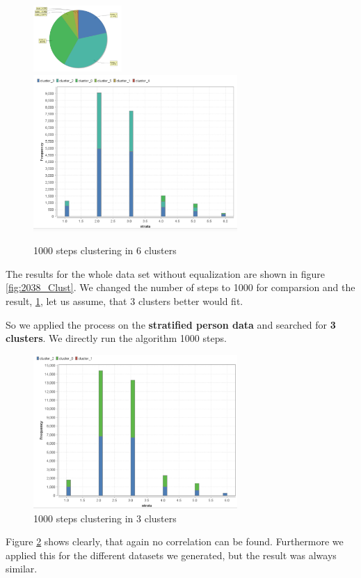 \begin{figure}[!htbp]
\centering
\includegraphics[width=0.3\textwidth]{vectorclusteringcluster1000.PNG}
\includegraphics[width=0.69\textwidth]{vectorClustering1000.PNG}
\caption{1000 steps clustering in 6 clusters}
\label{fig:1000vect}
\end{figure}

The results for the whole data set without equalization are shown in figure \ref{fig:2038_Clust}. We changed the number of steps to 1000 for comparsion and the result, \ref{fig:1000vect}, let us assume, that 3 clusters better would fit. 


So we applied the process on the \textbf{stratified person data} and searched for \textbf{3 clusters}. We directly run the algorithm 1000 steps.

\begin{figure}[!htbp]
\centering
\includegraphics[width=0.69\textwidth]{vectorClustering31000.PNG}
\caption{1000 steps clustering in 3 clusters}
\label{fig:1000vect3}
\end{figure}

Figure \ref{fig:1000vect3} shows clearly, that again no correlation can be found. Furthermore we applied this for the different datasets we generated, but the result was always similar.


